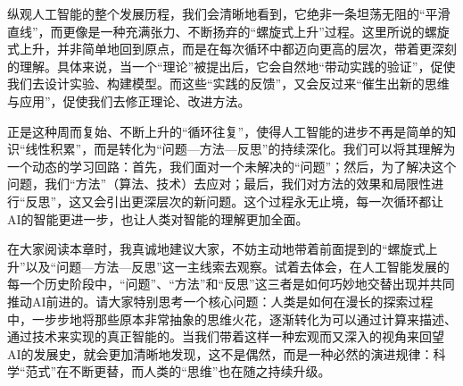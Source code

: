 

纵观人工智能的整个发展历程，我们会清晰地看到，它绝非一条坦荡无阻的“平滑直线”，而更像是一种充满张力、不断扬弃的“螺旋式上升”过程。这里所说的螺旋式上升，并非简单地回到原点，而是在每次循环中都迈向更高的层次，带着更深刻的理解。具体来说，当一个“理论”被提出后，它会自然地“带动实践的验证”，促使我们去设计实验、构建模型。而这些“实践的反馈”，又会反过来“催生出新的思维与应用”，促使我们去修正理论、改进方法。

正是这种周而复始、不断上升的“循环往复”，使得人工智能的进步不再是简单的知识“线性积累”，而是转化为“问题—方法—反思”的持续深化。我们可以将其理解为一个动态的学习回路：首先，我们面对一个未解决的“问题”；然后，为了解决这个问题，我们“方法”（算法、技术）去应对；最后，我们对方法的效果和局限性进行“反思”，这又会引出更深层次的新问题。这个过程永无止境，每一次循环都让AI的智能更进一步，也让人类对智能的理解更加全面。



在大家阅读本章时，我真诚地建议大家，不妨主动地带着前面提到的“螺旋式上升”以及“问题—方法—反思”这一主线索去观察。试着去体会，在人工智能发展的每一个历史阶段中，“问题”、“方法”和“反思”这三者是如何巧妙地交替出现并共同推动AI前进的。请大家特别思考一个核心问题：人类是如何在漫长的探索过程中，一步步地将那些原本非常抽象的思维火花，逐渐转化为可以通过计算来描述、通过技术来实现的真正智能的。当我们带着这样一种宏观而又深入的视角来回望AI的发展史，就会更加清晰地发现，这不是偶然，而是一种必然的演进规律：科学“范式”在不断更替，而人类的“思维”也在随之持续升级。

